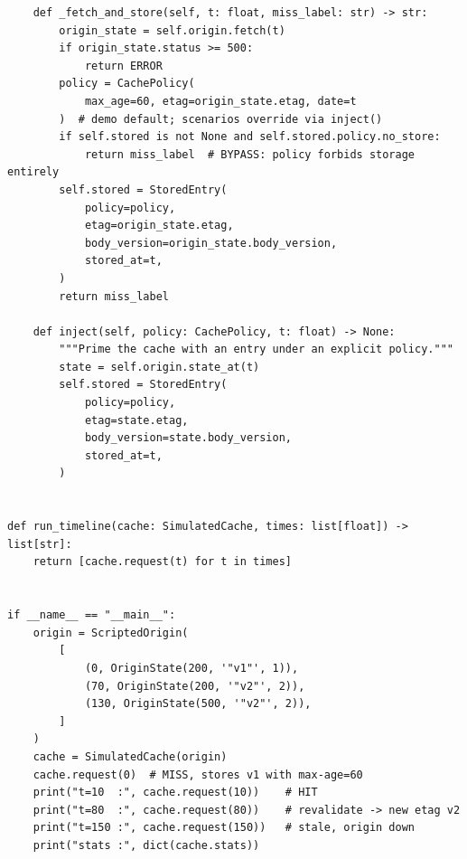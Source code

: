 \begin{verbatim}
    def _fetch_and_store(self, t: float, miss_label: str) -> str:
        origin_state = self.origin.fetch(t)
        if origin_state.status >= 500:
            return ERROR
        policy = CachePolicy(
            max_age=60, etag=origin_state.etag, date=t
        )  # demo default; scenarios override via inject()
        if self.stored is not None and self.stored.policy.no_store:
            return miss_label  # BYPASS: policy forbids storage entirely
        self.stored = StoredEntry(
            policy=policy,
            etag=origin_state.etag,
            body_version=origin_state.body_version,
            stored_at=t,
        )
        return miss_label

    def inject(self, policy: CachePolicy, t: float) -> None:
        """Prime the cache with an entry under an explicit policy."""
        state = self.origin.state_at(t)
        self.stored = StoredEntry(
            policy=policy,
            etag=state.etag,
            body_version=state.body_version,
            stored_at=t,
        )


def run_timeline(cache: SimulatedCache, times: list[float]) -> list[str]:
    return [cache.request(t) for t in times]


if __name__ == "__main__":
    origin = ScriptedOrigin(
        [
            (0, OriginState(200, '"v1"', 1)),
            (70, OriginState(200, '"v2"', 2)),
            (130, OriginState(500, '"v2"', 2)),
        ]
    )
    cache = SimulatedCache(origin)
    cache.request(0)  # MISS, stores v1 with max-age=60
    print("t=10  :", cache.request(10))    # HIT
    print("t=80  :", cache.request(80))    # revalidate -> new etag v2
    print("t=150 :", cache.request(150))   # stale, origin down
    print("stats :", dict(cache.stats))
\end{verbatim}

